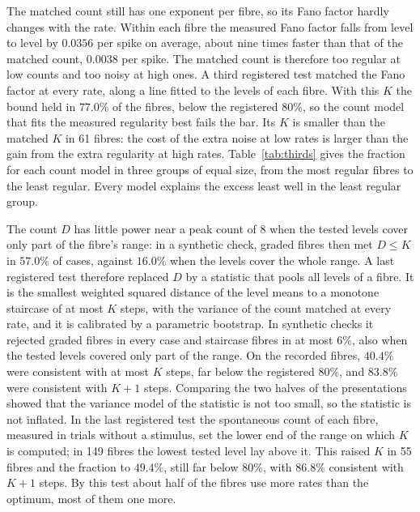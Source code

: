 The matched count still has one exponent per fibre, so its Fano factor hardly changes with the rate. Within each fibre the measured
Fano factor falls from level to level by $0.0356$ per spike on average, about nine times faster than that of the matched count,
$0.0038$ per spike. The matched count is therefore too regular at
low counts and too noisy at high ones. A third registered test matched the Fano factor at every rate, along a line fitted to the
levels of each fibre. With this $K$ the bound held in $77.0\%$ of the fibres, below the registered $80\%$, so the count model that fits
the measured regularity best fails the bar. Its $K$ is smaller than the matched $K$ in 61 fibres: the cost of the extra noise at low
rates is larger than the gain from the extra regularity at high rates. Table~\ref{tab:thirds} gives the fraction for each count model in
three groups of equal size, from the most regular fibres to the least regular. Every model explains the excess least well in the
least regular group.

The count $D$ has little power near a peak count of 8 when the tested levels cover only part of the fibre's range: in a synthetic
check, graded fibres then met $D\le K$ in $57.0\%$ of cases, against $16.0\%$ when the levels cover the whole range. A last registered test therefore replaced $D$ by a statistic that pools
all levels of a fibre. It is the smallest weighted squared distance of the level means to a monotone staircase of at most $K$ steps, with the
variance of the count matched at every rate, and it is calibrated by a parametric bootstrap. In synthetic checks it rejected graded
fibres in every case and staircase fibres in at most $6\%$, also when the tested levels covered only part of the range. On the
recorded fibres, $40.4\%$ were consistent with at most $K$ steps, far below the registered $80\%$, and $83.8\%$ were consistent with
$K+1$ steps. Comparing the two halves of the presentations showed that the variance model of the statistic is not too small, so the
statistic is not inflated. In the last registered test the spontaneous count of each fibre, measured in trials without a stimulus,
set the lower end of the range on which $K$ is computed; in 149 fibres the lowest tested level lay above it. This raised $K$ in 55
fibres and the fraction to $49.4\%$, still far below $80\%$, with $86.8\%$ consistent with $K+1$ steps. By this test about half of the
fibres use more rates than the optimum, most of them one more.

